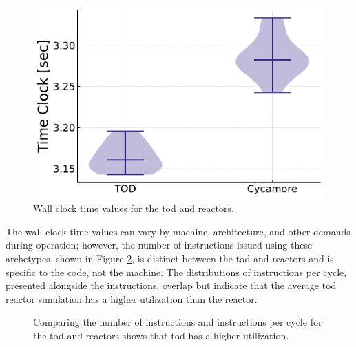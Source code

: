\begin{figure}[H]
    \centering
    \includegraphics[width=0.7\linewidth]{images/power_reactor/time_clock_violin.pdf}
    \caption{Wall clock time values for the \gls{tod} and \cycamore reactors.}
    \label{fig:time_violin}
\end{figure}

The wall clock time values can vary by machine, architecture, and other demands during operation; however, the number of instructions issued using these archetypes, shown in Figure \ref{fig:isn_violin}, is distinct between the \gls{tod} and \cycamore reactors and is specific to the code, not the machine. The distributions of instructions per cycle, presented alongside the instructions, overlap but indicate that the average \gls{tod} reactor simulation has a higher utilization than the \cycamore reactor.

\begin{figure}[H]
    \hfill
    \caption{Comparing the number of instructions and instructions per cycle for the \gls{tod} and \cycamore reactors shows that \gls{tod} has a higher utilization.}
    \label{fig:isn_violin}
\end{figure}

